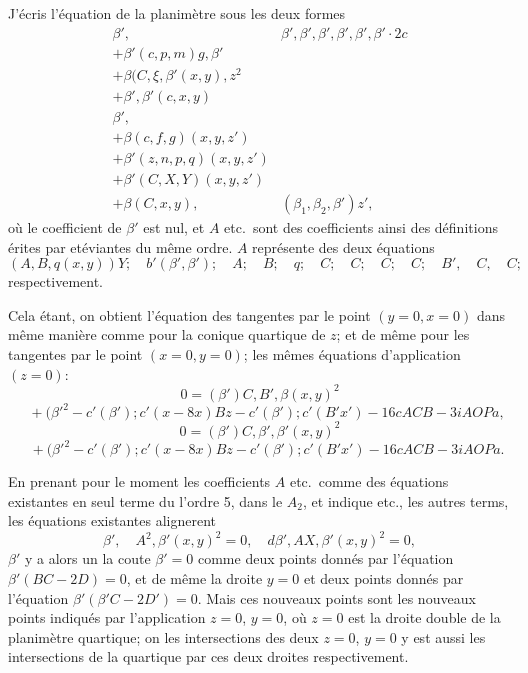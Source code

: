 \documentclass[11pt,a4paper]{book}
\begin{document}
J'\'ecris l'\'equation de la planim\`etre sous les deux formes
\begin{align*}
\beta', \quad & \beta', \beta', \beta', \beta', \beta', \beta' \cdot 2c \\
+ \beta'(c, p, m)g, \beta'  \\
+ \beta(C, \xi, \beta'(x, y), z^2 \\
+ \beta', \beta'(c, x, y) \\
\beta', \\
+ \beta(c, f, g)(x, y, z') \\
+ \beta'(z, n, p, q)(x, y, z') \\
+ \beta'(C, X, Y)(x, y, z') \\
+ \beta(C, x, y), &(\beta_1, \beta_2, \beta')z',
\end{align*}
o\`u le coefficient de $\beta'$ est nul, et $A$ etc.\ sont des coefficients ainsi des d\'efinitions
\'erites par et\'eviantes du m\^eme ordre.  $A$ repr\'esente des deux \'equations
\[
(A, B, q(x, y))Y; \quad b'(\beta', \beta'); \quad A; \quad B; \quad q; \quad C; \quad C; \quad C; \quad C; \quad B', \quad C, \quad C;
\]
respectivement.

Cela \'etant, on obtient l'\'equation des tangentes par le point $(y = 0, x = 0)$ dans m\^eme
mani\`ere comme pour la conique quartique de $z$; et de m\^eme pour les tangentes
par le point $(x = 0, y = 0)$; les m\^emes \'equations d'application $(z = 0)$:
\[
0 = (\beta')C, B', \beta(x, y)^2
\]
\[
\quad + (\beta'^2 - c'(\beta'); c'(x - 8x)Bz - c'(\beta'); c'(B'x') - 16cACB - 3iAOPa,
\]
\[
0 = (\beta')C, \beta', \beta'(x, y)^2
\]
\[
\quad + (\beta'^2 - c'(\beta'); c'(x - 8x)Bz - c'(\beta'); c'(B'x') - 16cACB - 3iAOPa.
\]

En prenant pour le moment les coefficients $A$ etc.\ comme des \'equations existantes en
seul terme du l'ordre 5, dans le $A_2$, et indique etc., les autres terms, les \'equations
existantes alignerent
\[
\beta', \quad A^2, \beta'(x, y)^2 = 0, \quad d\beta', AX, \beta'(x, y)^2 = 0,
\]
$\beta'$ y a alors un la coute $\beta' = 0$ comme deux points donn\'es par l'\'equation $\beta'(BC - 2D) = 0$,
et de m\^eme la droite $y = 0$ et deux points donn\'es par l'\'equation $\beta'(\beta'C - 2D') = 0$.
Mais ces nouveaux points sont les nouveaux points indiqu\'es par l'application $z = 0$, $y = 0$,
o\`u $z = 0$ est la droite double de la planim\`etre quartique; on les intersections des deux
$z = 0$, $y = 0$ y est aussi les intersections de la quartique par ces deux droites respectivement.

\clearpage
\end{document}
